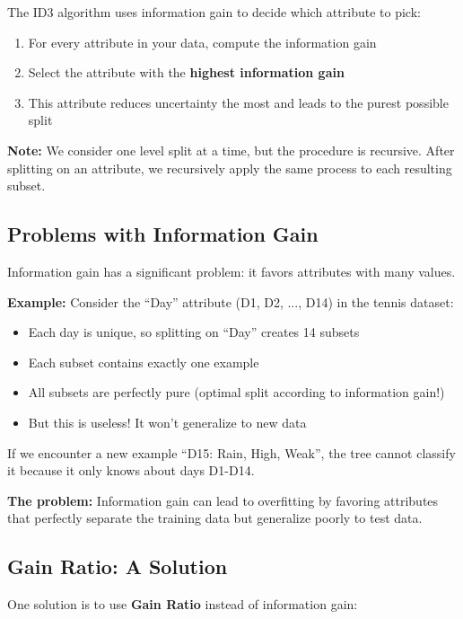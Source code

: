 \documentclass[11pt,a4paper]{article}
\theoremstyle{definition}
\theoremstyle{plain}
\theoremstyle{remark}
\begin{document}
The ID3 algorithm uses information gain to decide which attribute to pick:

\begin{enumerate}
    \item For every attribute in your data, compute the information gain
    \item Select the attribute with the \textbf{highest information gain}
    \item This attribute reduces uncertainty the most and leads to the purest possible split
\end{enumerate}

\textbf{Note:} We consider one level split at a time, but the procedure is recursive. After splitting on an attribute, we recursively apply the same process to each resulting subset.

\subsection{Problems with Information Gain}

Information gain has a significant problem: it favors attributes with many values.

\textbf{Example:} Consider the ``Day'' attribute (D1, D2, ..., D14) in the tennis dataset:
\begin{itemize}
    \item Each day is unique, so splitting on ``Day'' creates 14 subsets
    \item Each subset contains exactly one example
    \item All subsets are perfectly pure (optimal split according to information gain!)
    \item But this is useless! It won't generalize to new data
\end{itemize}

If we encounter a new example ``D15: Rain, High, Weak'', the tree cannot classify it because it only knows about days D1-D14.

\textbf{The problem:} Information gain can lead to overfitting by favoring attributes that perfectly separate the training data but generalize poorly to test data.

\subsection{Gain Ratio: A Solution}

One solution is to use \textbf{Gain Ratio} instead of information gain:
\end{document}
